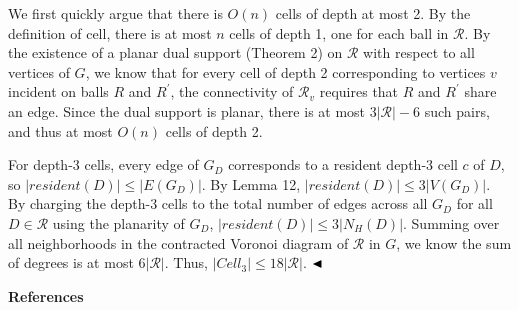 \documentclass[10pt,a4paper]{article}
\begin{document}
We first quickly argue that there is $O(n)$ cells of depth at most 2. By the definition of cell, there is at most $n$ cells of depth 1, one for each ball in $\mathcal{R}$. By the existence of a planar dual support (Theorem 2) on $\mathcal{R}$ with respect to all vertices of $G$, we know that for every cell of depth 2 corresponding to vertices $v$ incident on balls $R$ and $R^{\prime}$, the connectivity of $\mathcal{R}_{v}$ requires that $R$ and $R^{\prime}$ share an edge. Since the dual support is planar, there is at most $3|\mathcal{R}|-6$ such pairs, and thus at most $O(n)$ cells of depth 2.
\par
\par
For depth-3 cells, every edge of $G_{D}$ corresponds to a resident depth-3 cell $c$ of $D$, so $|\mathit{resident}(D)|\leq|E(G_{D})|$. By Lemma 12, $|\mathit{resident}(D)|\leq 3|V(G_{D})|$. By charging the depth-3 cells to the total number of edges across all $G_{D}$ for all $D\in\mathcal{R}$ using the planarity of $G_{D}$, $|\mathit{resident}(D)|\leq 3|N_{H}(D)|$. Summing over all neighborhoods in the contracted Voronoi diagram of $\mathcal{R}$ in $G$, we know the sum of degrees is at most $6|\mathcal{R}|$. Thus, $|\mathit{Cell}_{3}|\leq 18|\mathcal{R}|$. $\hfill\blacktriangleleft$
\par
\par
\par\medskip\noindent\textbf{References}\par
\end{document}
